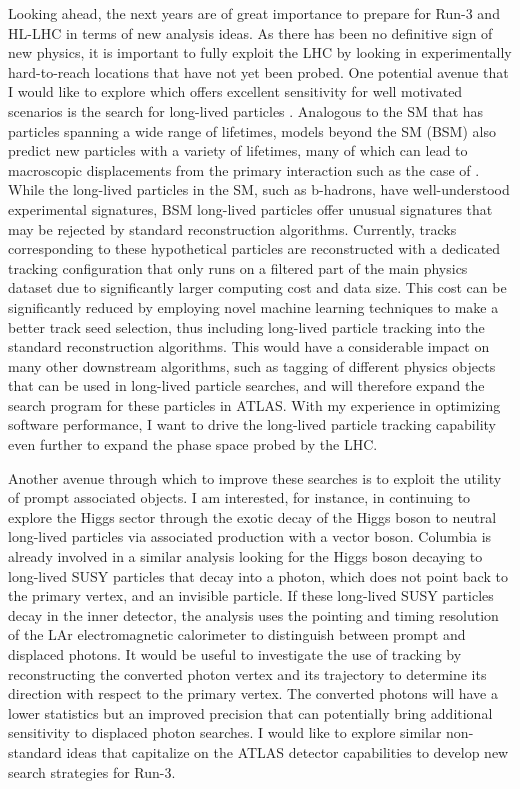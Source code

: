 \documentclass[a4paper]{article}
\begin{document}
Looking ahead, the next years are of great importance to prepare for Run-3 and HL-LHC in terms of new analysis ideas. As there has been no definitive sign of new physics,
it is important to fully exploit the LHC by looking in experimentally hard-to-reach locations that have not yet been probed.
One potential avenue that I would like to explore which offers excellent sensitivity for well motivated scenarios is the search for long-lived particles \cite{alimena2019searching}.
Analogous to the SM that has particles spanning a wide range of lifetimes, models beyond the SM (BSM) also predict new particles
with a variety of lifetimes, many of which can lead to macroscopic displacements from the primary interaction
such as the case of .
While the long-lived particles in the SM, such as b-hadrons, have well-understood experimental signatures, BSM long-lived particles
offer unusual signatures that may be rejected by standard reconstruction algorithms.
Currently, tracks corresponding to these hypothetical particles are reconstructed with a dedicated tracking configuration that only runs
on a filtered part of the main physics dataset due to significantly larger computing cost and data size. This cost can be significantly reduced
by employing novel machine learning techniques to make a better track seed selection, thus including long-lived particle tracking
into the standard reconstruction algorithms. This would have a considerable impact on many other downstream algorithms, such as tagging of different
physics objects that can be used in long-lived particle searches, and will therefore expand the search program for these particles in ATLAS.
With my experience in optimizing software performance, I want to drive the long-lived particle tracking capability even further to expand
the phase space probed by the LHC.

Another avenue through which to improve these searches is to exploit the utility of prompt associated objects.
I am interested, for instance, in continuing to explore the Higgs sector through the exotic decay of the Higgs boson to neutral long-lived particles
via associated production with a vector boson. Columbia is already involved in a similar analysis looking for the Higgs boson
decaying to long-lived SUSY particles that decay into a photon, which does not point back to the primary vertex, and an invisible particle.
If these long-lived SUSY particles decay in the inner detector, the analysis uses the pointing and timing resolution of the LAr electromagnetic calorimeter to distinguish between prompt and displaced photons.
It would be useful to investigate the use of tracking by reconstructing the converted photon vertex and its trajectory to determine
its direction with respect to the primary vertex. The converted photons will have a lower statistics but an improved precision that
can potentially bring additional sensitivity to displaced photon searches.
I would like to explore similar non-standard ideas that capitalize on the ATLAS detector capabilities to develop new search strategies for Run-3.
\end{document}
